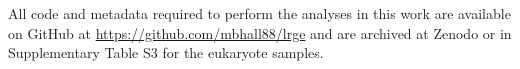 \documentclass[unnumsec,webpdf,modern,large]{oup-authoring-template}
\theoremstyle{thmstyleone}%
\theoremstyle{thmstyletwo}%
\theoremstyle{thmstylethree}%
\begin{document}
All code and metadata required to perform the analyses in this work are available on GitHub at \url{https://github.com/mbhall88/lrge} and are archived at Zenodo \citep{hall_2025_17183812} or in Supplementary Table S3 for the eukaryote samples.





\end{document}
